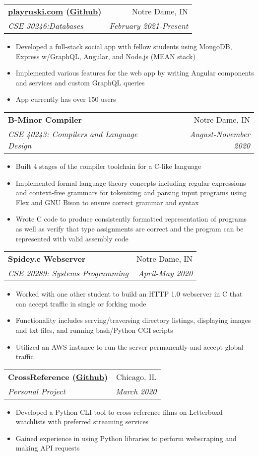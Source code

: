 \documentclass[letterpaper,10pt]{article}
\makeatletter
\newcommand{\resumeItem}[2]{
  \item\small{
    {#1}{#2 \vspace{-2pt}}
  }
}
\newcommand{\resumeSubheading}[4]{
  \vspace{-1pt}\item[]
  \begin{tabular*}{0.98\textwidth}{l@{\extracolsep{\fill}}r}
      \hspace{-10pt}\textbf{#1} & #2 \\
      \hspace{-10pt}\textit{\small#3} & \textit{\small #4} \\
    \end{tabular*}\vspace{-5pt}
}
\newcommand{\resumeItemListStart}{\begin{itemize}}
\newcommand{\resumeItemListEnd}{\end{itemize}\vspace{-5pt}}
\makeatother
\begin{document}
    \resumeSubheading
      {\href{https://playrsuski.com}{playruski.com} (\href{https://github.com/coderQuad/ruski}{\color{blue}\underline{Github}})}{Notre Dame, IN}
      {CSE 30246:Databases}{February 2021-Present}
        \resumeItemListStart
        \resumeItem{}
          {Developed a full-stack social app with fellow students using MongoDB, Express w/GraphQL, Angular, and Node.js (MEAN stack)}
        \resumeItem{}
          {Implemented various features for the web app by writing Angular components and services and custom GraphQL queries}
        \resumeItem{}
          {App currently has over 150 users}
      \resumeItemListEnd
      
    \vspace{-3pt}

    \resumeSubheading
      {B-Minor Compiler}{Notre Dame, IN}
      {CSE 40243: Compilers and Language Design}{August-November 2020}
        \resumeItemListStart
        \resumeItem{}
          {Built 4 stages of the compiler toolchain for a C-like language}
        \resumeItem{}
          {Implemented formal language theory concepts including regular expressions and context-free grammars for tokenizing and parsing input programs using Flex and GNU Bison to ensure correct grammar and syntax}
        \resumeItem{} 
          {Wrote C code to produce consistently formatted representation of programs as well as verify that type assignments are correct and the program can be represented with valid assembly code}
      \resumeItemListEnd
      
    \vspace{-3pt}

    \resumeSubheading
      {Spidey.c Webserver}{Notre Dame, IN}
      {CSE 20289: Systems Programming}{April-May 2020}
        \resumeItemListStart
        \resumeItem{}
          {Worked with one other student to build an HTTP 1.0 webserver in C that can accept traffic in single or forking mode}
        \resumeItem{}
          {Functionality includes serving/traversing directory listings, displaying images and txt files, and running bash/Python CGI scripts}
        \resumeItem{}
          {Utilized an AWS instance to run the server permanently and accept global traffic}
      \resumeItemListEnd
      
    \vspace{-3pt}
    \resumeSubheading
      {CrossReference (\href{https://github.com/cnrmrphy/crossReference}{\color{blue}\underline{Github}})}{Chicago, IL}
      {Personal Project}{March 2020}
        \resumeItemListStart
        \resumeItem{}
          {Developed a Python CLI tool to cross reference films on Letterboxd watchlists with preferred streaming services}
        \resumeItem{}
          {Gained experience in using Python libraries to perform webscraping and making API requests}
      \resumeItemListEnd
      
\end{document}
